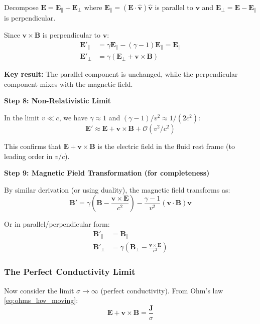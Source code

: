\documentclass[12pt,a4paper]{article}
\begin{document}
Decompose $\bm{E} = \bm{E}_\parallel + \bm{E}_\perp$ where
$\bm{E}_\parallel = (\bm{E} \cdot \hat{\bm{v}})\hat{\bm{v}}$ is parallel to $\bm{v}$
and $\bm{E}_\perp = \bm{E} - \bm{E}_\parallel$ is perpendicular.

Since $\bm{v} \times \bm{B}$ is perpendicular to $\bm{v}$:
\begin{align}
\bm{E}'_\parallel &= \gamma \bm{E}_\parallel - (\gamma - 1)\bm{E}_\parallel = \bm{E}_\parallel
\label{eq:E_parallel_transform} \\
\bm{E}'_\perp &= \gamma(\bm{E}_\perp + \bm{v} \times \bm{B})
\label{eq:E_perp_transform}
\end{align}

\textbf{Key result:} The parallel component is unchanged, while the perpendicular
component mixes with the magnetic field.

\textbf{Step 8: Non-Relativistic Limit}

In the limit $v \ll c$, we have $\gamma \approx 1$ and $(\gamma-1)/v^2 \approx 1/(2c^2)$:
\begin{equation}
\bm{E}' \approx \bm{E} + \bm{v} \times \bm{B} + \mathcal{O}(v^2/c^2)
\label{eq:E_transform_nonrel}
\end{equation}

This confirms that $\bm{E} + \bm{v} \times \bm{B}$ is the electric field in the
fluid rest frame (to leading order in $v/c$).

\textbf{Step 9: Magnetic Field Transformation (for completeness)}

By similar derivation (or using duality), the magnetic field transforms as:
\begin{equation}
\boxed{
\bm{B}' = \gamma\left(\bm{B} - \frac{\bm{v} \times \bm{E}}{c^2}\right)
- \frac{\gamma - 1}{v^2}(\bm{v} \cdot \bm{B})\bm{v}
}
\label{eq:B_transform}
\end{equation}

Or in parallel/perpendicular form:
\begin{align}
\bm{B}'_\parallel &= \bm{B}_\parallel \\
\bm{B}'_\perp &= \gamma\left(\bm{B}_\perp - \frac{\bm{v} \times \bm{E}}{c^2}\right)
\end{align}

\subsubsection{The Perfect Conductivity Limit}

Now consider the limit $\sigma \to \infty$ (perfect conductivity). From Ohm's law
\eqref{eq:ohms_law_moving}:
\begin{equation}
\bm{E} + \bm{v} \times \bm{B} = \frac{\bm{J}}{\sigma}
\label{eq:ohms_law_rearranged}
\end{equation}
\end{document}
